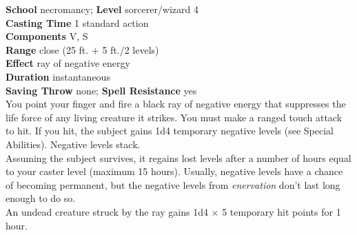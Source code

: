 \textbf{School} necromancy; \textbf{Level} sorcerer/wizard 4\\
\textbf{Casting Time} 1 standard action\\
\textbf{Components} V, S\\
\textbf{Range} close (25 ft. + 5 ft./2 levels)\\
\textbf{Effect} ray of negative energy\\
\textbf{Duration} instantaneous\\
\textbf{Saving Throw} none; \textbf{Spell Resistance} yes\\
You point your finger and fire a black ray of negative energy that suppresses the life force of any living creature it strikes. You must make a ranged touch attack to hit. If you hit, the subject gains 1d4 temporary negative levels (see Special Abilities). Negative levels stack.\\
Assuming the subject survives, it regains lost levels after a number of hours equal to your caster level (maximum 15 hours). Usually, negative levels have a chance of becoming permanent, but the negative levels from \textit{enervation }don't last long enough to do so.\\
An undead creature struck by the ray gains 1d4 × 5 temporary hit points for 1 hour.\\
